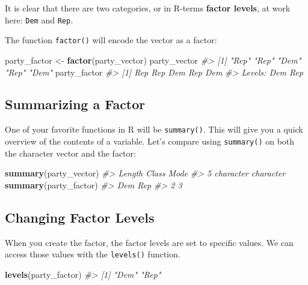 \documentclass[]{book}
\newenvironment{Shaded}{\begin{snugshade}}{\end{snugshade}}
\newcommand{\CommentTok}[1]{\textcolor[rgb]{0.56,0.35,0.01}{\textit{#1}}}
\newcommand{\KeywordTok}[1]{\textcolor[rgb]{0.13,0.29,0.53}{\textbf{#1}}}
\newcommand{\NormalTok}[1]{#1}
\newcommand{\StringTok}[1]{\textcolor[rgb]{0.31,0.60,0.02}{#1}}
\begin{document}
It is clear that there are two categories, or in R-terms \textbf{factor levels}, at work here: \texttt{Dem} and \texttt{Rep}.

The function \texttt{factor()} will encode the vector as a factor:

\begin{Shaded}
\begin{Highlighting}[]
\NormalTok{party_factor <-}\StringTok{ }\KeywordTok{factor}\NormalTok{(party_vector)}
\NormalTok{party_vector}
\CommentTok{#> [1] "Rep" "Rep" "Dem" "Rep" "Dem"}
\NormalTok{party_factor}
\CommentTok{#> [1] Rep Rep Dem Rep Dem}
\CommentTok{#> Levels: Dem Rep}
\end{Highlighting}
\end{Shaded}

\hypertarget{summarizing-a-factor}{%
\subsection{Summarizing a Factor}\label{summarizing-a-factor}}

One of your favorite functions in R will be \texttt{summary()}. This will give you a quick overview of the contents of a variable. Let's compare using \texttt{summary()} on both the character vector and the factor:

\begin{Shaded}
\begin{Highlighting}[]
\KeywordTok{summary}\NormalTok{(party_vector)}
\CommentTok{#>    Length     Class      Mode }
\CommentTok{#>         5 character character}
\KeywordTok{summary}\NormalTok{(party_factor)}
\CommentTok{#> Dem Rep }
\CommentTok{#>   2   3}
\end{Highlighting}
\end{Shaded}

\hypertarget{changing-factor-levels}{%
\subsection{Changing Factor Levels}\label{changing-factor-levels}}

When you create the factor, the factor levels are set to specific values. We can access those values with the \texttt{levels()} function.

\begin{Shaded}
\begin{Highlighting}[]
\KeywordTok{levels}\NormalTok{(party_factor)}
\CommentTok{#> [1] "Dem" "Rep"}
\end{Highlighting}
\end{Shaded}
\end{document}
